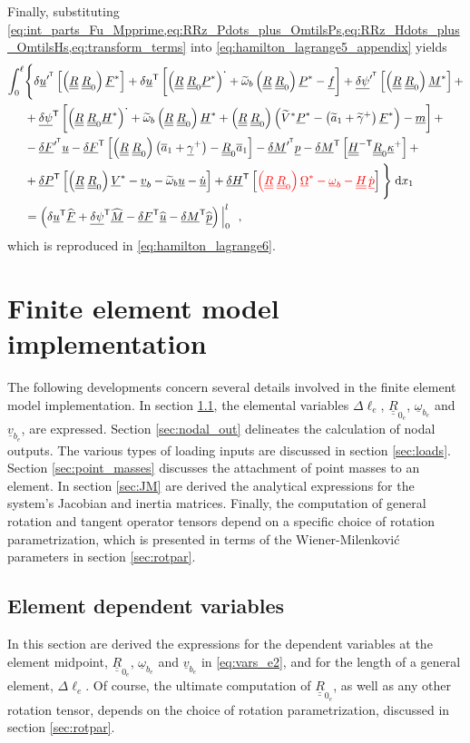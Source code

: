 \documentclass[12pt,a4paper,oneside,english]{abntex2} %
\newcommand{\fix}[1]{{\color{red}#1}}
\newcommand{\vect}[1]{\underline{#1}}
\newcommand{\uvec}[1]{\overline{#1}}
\def\tens#1{\underline{\underline{#1}}}
\def\til#1{\widetilde{#1}}
\def\lb{\left[}
\def\rb{\right]}
\def\lp{\left(}
\def\rp{\right)}
\def\T{\mathsf{T}}
\def\xo{x_1}
\def\aone{\uvec{a}_1}
\def\aonetil{\til{a}_1}
\def\dotout{^{\boldsymbol{\cdot}}}
\def\R{\tens{R}}
\def\Rz{\R_0}
\def\u{\vect{u}}
\def\uT{\u^\T}
\def\udot{\dot{\u}}
\def\uprimeT{\u^{\prime^\T}}
\def\uhat{\widehat{\u}}
\def\vb{\vect{v}_b}
\def\om{\vect{\omega}_b}
\def\omtil{\til{\omega}_b}
\def\gam{\vect{\gamma}}
\def\gamp{\gam^{+}}
\def\gamptil{\til{\gamma}^{+}}
\def\kap{\vect{\kappa}}
\def\kapp{\kap^{+}}
\def\V{\vect{V}}
\def\Vs{\V^{*}}
\def\Vtils{\til{V}^{*}}
\def\Om{\vect{\Omega}}
\def\Oms{\Om^{*}}
\def\P{\vect{P}}
\def\Ps{\P^*}
\def\Hv{\vect{H}}
\def\Hvs{\Hv^*}
\def\H{\tens{H}}
\def\HinvT{\H^{-\T}}
\def\p{\vect{p}}
\def\pdot{\dot{\p}}
\def\phat{\widehat{\p}}
\def\F{\vect{F}}
\def\Fhat{\widehat{\F}}
\def\Fs{\F^*}
\def\M{\vect{M}}
\def\Mhat{\widehat{\M}}
\def\Ms{\M^*}
\def\f{\vect{f}}
\def\m{\vect{m}}
\def\delF{\vect{\delta F}}
\def\delFT{\delF^\T}
\def\delFpT{\delF^{\prime^\T}}
\def\delM{\vect{\delta M}}
\def\delMT{\delM^\T}
\def\delMpT{\delM^{\prime^\T}}
\def\delP{\vect{\delta P}}
\def\delPT{\delP^\T}
\def\delH{\vect{\delta H}}
\def\delHT{\delH^\T}
\def\delpsi{\vect{\delta\psi}}
\def\delpsiT{\delpsi^\T}
\def\delpsipT{\delpsi^{\prime^\T}}
\def\Deltal{\Delta \ell_e}
\def\intl{\int_{0}^{\ell}}
\def\d{\textnormal{d}}
\def\RRz{\lp\R\;\Rz\rp}
\def\vbe{\vect{v}_{b_e}}
\def\ombe{\vect{\omega}_{b_e}}
\def\Rze{\R_{0_e}}
\begin{document}
\begin{apendicesenv}
Finally, substituting \cref{eq:int_parts_Fu_Mpprime,eq:RRz_Pdots_plus_OmtilsPs,eq:RRz_Hdots_plus_OmtilsHs,eq:transform_terms} into \cref{eq:hamilton_lagrange5_appendix} yields
\begin{align}
	\intl &\Biggl\{\Biggr. \delta\uprimeT\lb\RRz\Fs\rb + \delta\uT\lb\lp\R\;\Rz\Ps\rp\dotout+\omtil\RRz\Ps-\f\rb + \delpsipT\lb\RRz\Ms\rb +
	\nonumber \\
	&+\delpsiT\lb\lp\R\;\Rz\Hvs\rp\dotout+\omtil\RRz\Hvs+\RRz\lp\Vtils\Ps-\lp\aonetil+\gamptil\rp\Fs\rp-\m\rb + \nonumber \\
	&-\delFpT\u -\delFT\lb\RRz\lp\aone+\gamp\rp-\Rz\aone\rb - \delMpT\p -\delMT\lb\HinvT\Rz\kapp\rb +
	\nonumber \\
	&+\delPT\lb\RRz\Vs-\vb-\omtil\u-\udot\rb + \delHT\lb\fix{\RRz\Oms-\om-\H\,\pdot}\rb
	\Biggl.\Biggr\}\;\d \xo \nonumber \\
	&=\lp \delta\uT\Fhat+\delpsiT\Mhat-\delFT\uhat-\delMT\phat \rp\Big|_{0}^{l} \ \ ,
    \label{eq:hamilton_lagrange6_appendix}
\end{align}
which is reproduced in \cref{eq:hamilton_lagrange6}.

\chapter{Finite element model implementation}
\label{appendix_fem}

The following developments concern several details involved in the finite element model implementation. In section \ref{sec:elem_dep_vars}, the elemental variables $\Deltal$, $\Rze$, $\ombe$ and $\vbe$, are expressed. Section \ref{sec:nodal_out} delineates the calculation of nodal outputs. The various types of loading inputs are discussed in section \ref{sec:loads}. Section \ref{sec:point_masses} discusses the attachment of point masses to an element. In section \ref{sec:JM} are derived the analytical expressions for the system's Jacobian and inertia matrices. Finally, the computation of general rotation and tangent operator tensors depend on a specific choice of rotation parametrization, which is presented in terms of the Wiener-Milenkovi\'{c} parameters in section \ref{sec:rotpar}.

\section{Element dependent variables}
\label{sec:elem_dep_vars}

In this section are derived the expressions for the dependent variables at the element midpoint, $\Rze$, $\ombe$ and $\vbe$ in \cref{eq:vars_e2}, and for the length of a general element, $\Deltal$. Of course, the ultimate computation of $\Rze$, as well as any other rotation tensor, depends on the choice of rotation parametrization, discussed in section \ref{sec:rotpar}.


\end{apendicesenv}
\end{document}
